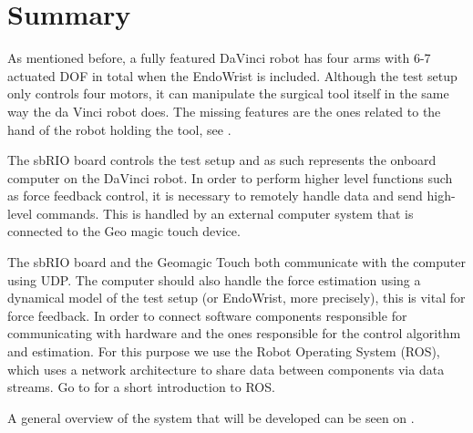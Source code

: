 \section{Summary}
As mentioned before, a fully featured DaVinci robot has four arms with 6-7 actuated \gls{DOF} in total when the EndoWrist is included.
Although the test setup only controls four motors, it can manipulate the surgical tool itself in the same way the da Vinci robot does. The missing features are the ones related to the hand of the robot holding the tool, see .

The sbRIO board controls the test setup and as such represents the onboard computer on the DaVinci robot.
In order to perform higher level functions such as force feedback control, it is necessary to remotely handle data and send high-level commands.
This is handled by an external computer system that is connected to the Geo magic touch device.

The sbRIO board and the Geomagic Touch both communicate with the computer using UDP. The computer should also handle the force estimation using a dynamical model of the test setup (or EndoWrist, more precisely), this is vital for force feedback.
In order to connect software components responsible for communicating with hardware and the ones responsible for the control algorithm and estimation.
For this purpose we use the Robot Operating System (ROS), which uses a network architecture to share data between components via data streams. Go to  for a short introduction to ROS.

A general overview of the system that will be developed can be seen on .






